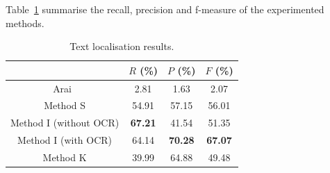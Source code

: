 Table~\ref{tab:text_results} summarise the recall, precision and f-measure of the experimented methods.

  \begin{table}[ht]
    \normalsize
    \centering
    \caption{Text localisation results.}
    \begin{tabular}{|c|c|c|c|}
          \hline
          &  $R$ (\%)  & $P$ (\%)  & $F$ (\%)  \\
          \hline
          Arai~\cite{Arai11}  & 2.81    & 1.63      & 2.07       \\
          \hline
          Method S            & 54.91   & 57.15     & 56.01       \\
          \hline
          Method I (without OCR)  & \textbf{67.21}   & 41.54    & 51.35       \\
          \hline
          Method I (with OCR)  & 64.14   & \textbf{70.28}    & \textbf{67.07}       \\
          \hline
          Method K  & 39.99   & 64.88    & 49.48       \\
          \hline
        \end{tabular}
    \label{tab:text_results}
  \end{table}%


